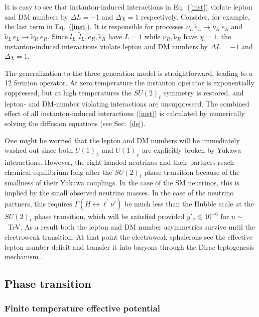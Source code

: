 \documentclass[prd,showpcs,amsmath,amssymb,nofootinbib,preprintnumbers,balancelastpage,longbibliography,superscriptaddress,notitlepage]{revtex4}
\begin{document}
It is easy to see that instanton-induced interactions in Eq.~(\ref{inst}) violate lepton and DM numbers by $\Delta L =-1$ and $\Delta \chi = 1$ respectively. Consider, for example, the last term in Eq.~(\ref{inst}). It is responsible for processes $\nu_L \,\tilde{e}_L \rightarrow \tilde{\nu}_R \ {e}_R$ and $\tilde{\nu}_L \,e_L \rightarrow \tilde{\nu}_R \ {e}_R$. Since $l_L, \tilde{l}_L, e_R, \tilde{e}_R$ have $L=1$ while $\nu_R, \tilde{\nu}_R$ have $\chi=1$, the instanton-induced interactions violate lepton and DM numbers by $\Delta L =-1$ and $\Delta \chi = 1$.

The generalization to the three generation model is straightforward, leading to a 12 fermion operator. At zero temperature the instanton operator is exponentially suppressed,
but at high temperatures the $SU(2)_\ell$ symmetry is restored, and lepton- and DM-number violating interactions are unsuppressed. The combined effect of all instanton-induced interactions (\ref{inst}) is calculated by numerically solving the diffusion equations (see Sec.~\ref{de}). 

One might be worried that the lepton and DM numbers will be immediately washed out since both $U(1)_L$ and $U(1)_\chi$ are explicitly broken by Yukawa interactions. However, the right-handed neutrinos and their partners reach chemical equilibrium long after the $SU(2)_\ell$ phase transition because of the smallness of their Yukawa couplings.  In the case of the SM neutrinos, this is implied by the small observed neutrino masses.  In the case of the neutrino partners,
this requires $\Gamma ( H \leftrightarrow \ell^\prime \nu' )$ be much less than the Hubble scale at the $SU(2)_\ell$ phase transition, 
which will be satisfied provided $y'_\nu \lesssim 10^{-6}$ for $u \sim$~TeV.
As a result both the lepton and DM number asymmetries survive until the electroweak transition. At that point the electroweak sphalerons see the effective lepton number deficit and transfer it into baryons through the Dirac leptogenesis mechanism \cite{Dick:1999je,Murayama:2002je}.




\subsection{Phase transition}

\subsubsection{Finite temperature effective potential}
\end{document}

